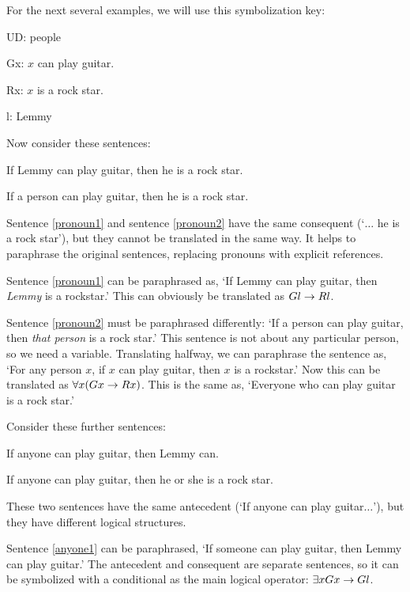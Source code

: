 For the next several examples, we will use this symbolization key:

\begin{ekey}
\item[UD:] people
\item[Gx:] $x$ can play guitar.
\item[Rx:] $x$ is a rock star.
\item[l:] Lemmy
\end{ekey}

Now consider these sentences:

\begin{earg}
\item[\ex{pronoun1}] If Lemmy can play guitar, then he is a rock star.
\item[\ex{pronoun2}] If a person can play guitar, then he is a rock star.
\end{earg}

Sentence \ref{pronoun1} and sentence \ref{pronoun2} have the same consequent (`$\ldots$ he is a rock star'), but they cannot be translated in the same way. It helps to paraphrase the original sentences, replacing pronouns with explicit references.

Sentence \ref{pronoun1} can be paraphrased as, `If Lemmy can play guitar, then \emph{Lemmy} is a rockstar.' This can obviously be translated as $Gl \rightarrow Rl$.

Sentence \ref{pronoun2} must be paraphrased differently: `If a person can play guitar, then \emph{that person} is a rock star.' This sentence is not about any particular person, so we need a variable. Translating halfway, we can paraphrase the sentence as, `For any person $x$, if $x$ can play guitar, then $x$ is a rockstar.' Now this can be translated as $\forall x (Gx \rightarrow Rx)$. This is the same as, `Everyone who can play guitar is a rock star.'


Consider these further sentences:

\begin{earg}
\item[\ex{anyone1}] If anyone can play guitar, then Lemmy can.
\item[\ex{anyone2}] If anyone can play guitar, then he or she is a rock star.
\end{earg}

These two sentences have the same antecedent (`If anyone can play guitar$\ldots$'), but they have different logical structures.

Sentence \ref{anyone1} can be paraphrased, `If someone can play guitar, then Lemmy can play guitar.' The antecedent and consequent are separate sentences, so it can be symbolized with a conditional as the main logical operator: $\exists x Gx \rightarrow Gl$.

